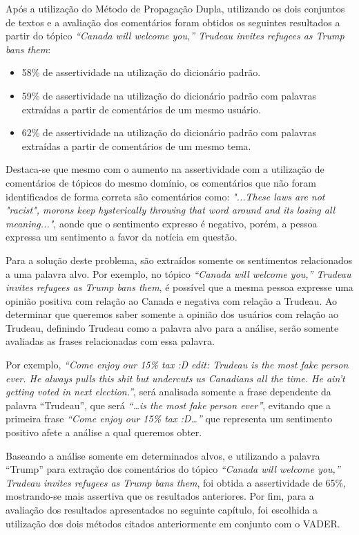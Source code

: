 Após a utilização do Método de Propagação Dupla, utilizando os dois conjuntos
de textos e a avaliação dos comentários foram
obtidos os seguintes resultados a partir do tópico \textit{``Canada will welcome
you,” Trudeau invites refugees as Trump bans them}:
\begin{itemize}
  \item 58\% de assertividade na utilização do dicionário padrão.
  \item 59\% de assertividade na utilização do dicionário padrão com palavras
  extraídas a partir de comentários de um mesmo usuário.
  \item 62\% de assertividade na utilização do dicionário padrão com palavras
  extraídas a partir de comentários de um mesmo tema.
\end{itemize}
 
Destaca-se que mesmo com o aumento na assertividade com a utilização de
comentários de tópicos do mesmo domínio, os comentários que não foram
identificados de forma correta são comentários como: \textit{"...These
laws are not "racist", morons keep hysterically throwing that word around and
its losing all meaning..."}, aonde que o sentimento expresso é negativo, porém,
a pessoa expressa um sentimento a favor da notícia em questão. 

Para a solução deste problema, são extraídos somente os sentimentos relacionados
a uma palavra alvo. Por exemplo, no tópico \textit{``Canada will welcome you,”
Trudeau invites refugees as Trump bans them}, é possível que a mesma pessoa expresse uma opinião positiva com relação
ao Canada e negativa com relação a Trudeau. Ao determinar que queremos saber
somente a opinião dos usuários com relação ao Trudeau, definindo Trudeau como a
palavra alvo para a análise, serão somente avaliadas as frases
relacionadas com essa palavra. 

Por exemplo, \textit{``Come enjoy our 15\% tax
:D edit: Trudeau is the most fake person ever. He always pulls this shit but
undercuts us Canadians all the time. He ain't getting voted in next
election.''}, será analisada somente a frase dependente da palavra ``Trudeau'',
que será \textit{``\ldots is the most fake person ever''}, evitando que a
primeira frase \textit{``Come enjoy our 15\% tax :D\ldots''} que representa um
sentimento positivo afete a análise a qual queremos obter.

Baseando a análise somente em determinados alvos, e utilizando a palavra
``Trump'' para extração dos comentários do tópico \textit{``Canada will welcome you,” Trudeau invites refugees as Trump bans them}, foi obtida a assertividade
de 65\%, mostrando-se mais assertiva que os resultados anteriores. Por fim, para
a avaliação dos resultados apresentados no seguinte capítulo, foi escolhida a
utilização dos dois métodos citados anteriormente em conjunto com o \ac{VADER}.



